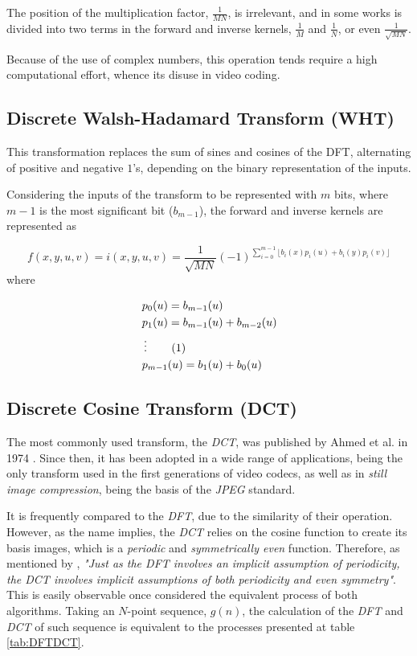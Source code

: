 The position of the multiplication factor, $\frac{1}{MN}$, is irrelevant, and in some works is divided into two terms in the forward and inverse kernels, $\frac{1}{M}$ and $\frac{1}{N}$, or even $\frac{1}{\sqrt{MN}}$. \nocite{gonzalezDigitalImageProcessing2018}

Because of the use of complex numbers, this operation tends require a high computational effort, whence its disuse in video coding.

\subsection{Discrete Walsh-Hadamard Transform (WHT)}

This transformation replaces the sum of sines and cosines of the DFT, alternating of positive and negative $1$'s, depending on the binary representation of the inputs.

Considering the inputs of the transform to be represented with $m$ bits, where $m-1$ is the most significant bit ($b_{m-1}$), the forward and inverse kernels are represented as

\begin{equation}
    f(x,y,u,v) = i(x,y,u,v) = \frac{1}{\sqrt{MN}}(-1)^{\sum_{i=0}^{m-1}\lfloor b_i(x)p_i(u)+b_i(y)p_i(v)\rfloor}
\end{equation}
where

\begin{align*}
    &p_0(u)=b_{m-1}(u) \\
    &p_1(u)=b_{m-1}(u) +b_{m-2}(u) \\
    \,&\vdots \addtocounter{equation}{1}\tag{\theequation} \\
    &p_{m-1}(u)=b_1(u)+b_0(u) 
\end{align*}

\subsection{Discrete Cosine Transform (DCT)}

The most commonly used transform, the \emph{DCT}, was published by Ahmed et al. in 1974 \cite{ahmedDiscreteCosineTransform1974}. Since then, it has been adopted in a wide range of applications, being the only transform used in the first generations of video codecs, as well as in \emph{still image compression}, being the basis of the \emph{\gls{JPEG}} standard.

It is frequently compared to the \emph{DFT}, due to the similarity of their operation. However, as the name implies, the \emph{DCT} relies on the cosine function to create its basis images, which is a \emph{periodic} and \emph{symmetrically even} function. Therefore, as mentioned by \cite[A. V. Oppenheim]{oppenheimDiscretetimeSignalProcessing1998}, \emph{"Just as the DFT involves an implicit assumption of periodicity, the DCT involves implicit assumptions of both periodicity and even symmetry"}.  This is easily observable once considered the equivalent process of both algorithms. Taking an $N$-point sequence, $g(n)$, the calculation of the \emph{DFT} and \emph{DCT} of such sequence is equivalent to the processes presented at table \ref{tab:DFTDCT}.

